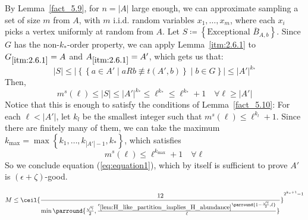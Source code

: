                 By Lemma~\ref{fact_5.9}, for $n = |A|$ large enough, we can approximate sampling a set of size $m$ from $A$,
                with $m$ i.i.d. random variables $x_1, \dots, x_m$, where each $x_i$ picks a vertex uniformly at random from $A$.
                Let $S \coloneq \left\{ \text{Exceptional } \overline{B}_{A,b} \right\}$.
                Since $G$ has the non-$k_{*}$-order property, we can apply Lemma~\ref{itm:2.6.1} to $G_{\ref{itm:2.6.1}} = A$
                and $A_{\ref{itm:2.6.1}} = A'$, which gets us that:
                $$
                    |S| \leq \left|\left\{ \left\{ a \in A' \mid a R b \not\equiv t(A', b) \right\} \mid b \in G \right\} \right|
                    \leq |A'|^{k_*}
                $$
                Then,
                $$
                    m^s(\ell) \leq \left| S \right| \leq |A'|^{k_*} \leq \ell^{k_*} \leq \ell^{k_{*}} + 1 \quad \forall \ell \geq |A'|
                $$
                Notice that this is enough to satisfy the conditions of Lemma~\ref{fact_5.10}:
                For each $\ell < |A'|$, let $k_l$ be the smallest integer such that $m^s(\ell) \leq \ell^{k_l} + 1$.
                Since there are finitely many of them, we can take the maximum
                $k_{\max} = \max \left\{ k_1, \dots, k_{|A'|-1}, k_* \right\}$, which satisfies
                $$
                    m^s(\ell) \leq \ell^{k_{\max}} + 1 \quad \forall \ell
                $$
                So we conclude equation (\ref{eq:equation1}), which by itself is sufficient to prove $A'$ is
                $(\epsilon + \zeta)$-good.


            \[
                M \leq \ceil{\frac{12}{\min\parround{\frac{\sqrt{\gamma}}{2}, \frac{\epsilon_{\ref{lem:H_like_partition_implies_H_abundance}}
                    \parround{1 - \frac{\sqrt{\gamma}}{2}, \ell}}{\ell}}}}^{2^{k_*+1}-1}
            \]

